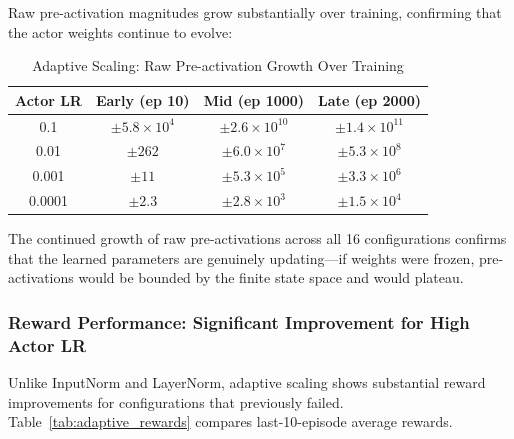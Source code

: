 Raw pre-activation magnitudes grow substantially over training, confirming that the actor weights continue to evolve:

\begin{table}[htbp]
\caption{Adaptive Scaling: Raw Pre-activation Growth Over Training}
\label{tab:adaptive_preact}
\centering
\small
\begin{tabular}{cccc}
\toprule
\textbf{Actor LR} & \textbf{Early (ep 10)} & \textbf{Mid (ep 1000)} & \textbf{Late (ep 2000)} \\
\midrule
0.1 & $\pm 5.8 \times 10^4$ & $\pm 2.6 \times 10^{10}$ & $\pm 1.4 \times 10^{11}$ \\
0.01 & $\pm 262$ & $\pm 6.0 \times 10^7$ & $\pm 5.3 \times 10^8$ \\
0.001 & $\pm 11$ & $\pm 5.3 \times 10^5$ & $\pm 3.3 \times 10^6$ \\
0.0001 & $\pm 2.3$ & $\pm 2.8 \times 10^3$ & $\pm 1.5 \times 10^4$ \\
\bottomrule
\end{tabular}
\end{table}

The continued growth of raw pre-activations across all 16 configurations confirms that the learned parameters are genuinely updating---if weights were frozen, pre-activations would be bounded by the finite state space and would plateau.

\subsubsection{Reward Performance: Significant Improvement for High Actor LR}

Unlike InputNorm and LayerNorm, adaptive scaling shows substantial reward improvements for configurations that previously failed. Table~\ref{tab:adaptive_rewards} compares last-10-episode average rewards.

